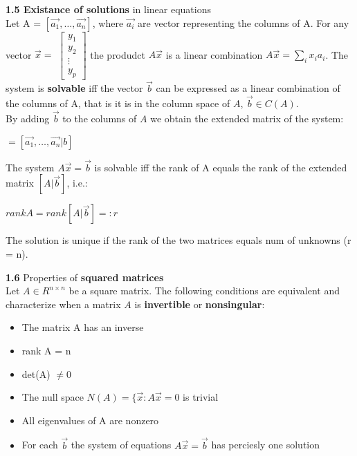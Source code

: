\documentclass{article}
\begin{document}
\begin{multicols}{3}
\textbf{1.5 Existance of solutions} in linear equations\\
Let A = $[\vec{a_1}, \dots, \vec{a_n} ]$, where $\vec{a_i}$ are vector representing
the columns of A.
For any vector $\vec{x} =$ \begin{math}
                             \begin{bmatrix}
                                  y_1 \\
                                  y_2 \\
                                  \vdots \\
                                  y_p
                             \end{bmatrix}
                           \end{math}
the produdct $A\vec{x}$ is 
a linear combination $A\vec{x} = \sum_i x_i a_i$. The system is \textbf{solvable} iff the
vector $\vec{b}$ can be expressed as a linear combination of the columns of A, that is
it is in the column space of $A$, $\vec{b} \in C(A)$.\\
By adding $\vec{b}$ to the columns of $A$ we obtain the extended matrix of the system:
\begin{center}
    \begin{math}
        [A| \vec{b}] = [\vec{a_1}, \dots, \vec{a_n} | b]
    \end{math}
\end{center}
The system $A\vec{x} = \vec{b}$ is solvable iff the rank of A equals the rank of the
extended matrix $[A| \vec{b}]$, i.e.:
\begin{center}
    \begin{math}
        rank A = rank [A| \vec{b}] =: r
    \end{math}
\end{center}
The solution is unique if the rank of the two matrices equals num of unknowns (r = n).

\textbf{1.6} Properties of \textbf{squared matrices}\\
Let $A \in R^{n \times n}$ be a square matrix. The following conditions are equivalent
and characterize when a matrix $A$ is \textbf{invertible} or \textbf{nonsingular}:
\begin{itemize}
    \setlength\itemsep{0.1em}
    \item The matrix A has an inverse
    \item rank A = n
    \item det(A) $\neq 0$
    \item The null space $N(A) = \{\vec{x}: A\vec{x} = 0$ is trivial
    \item All eigenvalues of A are nonzero
    \item For each $\vec{b}$ the system of equations $A \vec{x} = \vec{b}$ has perciesly one solution
\end{itemize}


\end{multicols}
\end{document}
